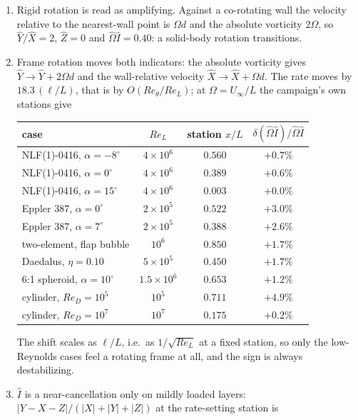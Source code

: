 \documentclass[10pt]{article}
\begin{document}
\begin{enumerate}\itemsep2pt
\item Rigid rotation is read as amplifying. Against a co-rotating wall the
  velocity relative to the nearest-wall point is $\Omega d$ and the absolute
  vorticity $2\Omega$, so $\hat Y/\hat X\!=\!2$, $\hat Z\!=\!0$ and
  $\hat\Omega\hat I\!=\!0.40$: a solid-body rotation transitions.
\item Frame rotation moves both indicators: the absolute vorticity gives
  $\hat Y\!\to\!\hat Y+2\Omega d$ and the wall-relative velocity
  $\hat X\!\to\!\hat X+\Omega d$. The rate moves by $18.3\,(\ell/L)$, that
  is by $O(Re_\theta/Re_L)$; at $\Omega\!=\!U_\infty/L$ the campaign's own
  stations give
  \begin{center}\small
  \begin{tabular}{lccc}
    \toprule
    case & $Re_L$ & station $x/L$ & $\delta(\hat\Omega\hat I)/\hat\Omega\hat I$ \\
    \midrule
    NLF(1)-0416, $\alpha=-8^\circ$ & $4\times10^6$ & $0.560$ & $+0.7\%$ \\
    NLF(1)-0416, $\alpha=0^\circ$  & $4\times10^6$ & $0.389$ & $+0.6\%$ \\
    NLF(1)-0416, $\alpha=15^\circ$ & $4\times10^6$ & $0.003$ & $+0.0\%$ \\
    Eppler 387, $\alpha=0^\circ$   & $2\times10^5$ & $0.522$ & $+3.0\%$ \\
    Eppler 387, $\alpha=7^\circ$   & $2\times10^5$ & $0.388$ & $+2.6\%$ \\
    two-element, flap bubble        & $10^6$        & $0.850$ & $+1.7\%$ \\
    Daedalus, $\eta=0.10$          & $5\times10^5$ & $0.450$ & $+1.7\%$ \\
    6:1 spheroid, $\alpha=10^\circ$ & $1.5\times10^6$ & $0.653$ & $+1.2\%$ \\
    cylinder, $Re_D=10^5$           & $10^5$        & $0.711$ & $+4.9\%$ \\
    cylinder, $Re_D=10^7$           & $10^7$        & $0.175$ & $+0.2\%$ \\
    \bottomrule
  \end{tabular}
  \end{center}
  The shift scales as $\ell/L$, i.e.\ as $1/\sqrt{Re_L}$ at a fixed station,
  so only the low-Reynolds cases feel a rotating frame at all, and the sign is
  always destabilizing.
\item $\hat I$ is a near-cancellation only on mildly loaded layers:
  $|Y\!-\!X\!-\!Z|/(|X|\!+\!|Y|\!+\!|Z|)$ at the rate-setting station is

\end{enumerate}
\end{document}
